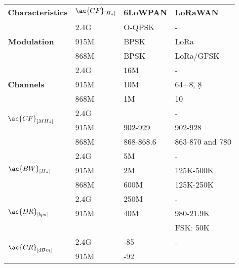\begin{table}
\centering
\begin{tabular}{l|l|l|l}
	\bf{Characteristics}               & $\ac{CF}_{[Hz]}$ & \bf{6LoWPAN} & \bf{LoRaWAN}     \\\hline
	\multirow{3}{*}{\bf{Modulation}}   & 2.4G             & O-QPSK       & -                \\
	\                                  & 915M             & BPSK         & LoRa             \\
	\                                  & 868M             & BPSK         & LoRa/GFSK        \\\hline
	\multirow{3}{*}{\bf{Channels}}     & 2.4G             & 16M          & -                \\
	\                                  & 915M             & 10M          & 64+8\u, 8\d      \\
	\                                  & 868M             & 1M           & 10               \\\hline
	\multirow{2}{*}{$\ac{CF}_{[MHz]}$} & 2.4G             & \ko          & -                \\
	\                                  & 915M             & 902-929      & 902-928          \\
	\                                  & 868M             & 868-868.6    & 863-870 and 780  \\\hline
	\multirow{3}{*}{$\ac{BW}_{[Hz]}$}  & 2.4G             & 5M           & -                \\
	\                                  & 915M             & 2M           & 125K-500K        \\
	\                                  & 868M             & 600M         & 125K-250K        \\\hline
	\multirow{3}{*}{$\ac{DR}_{[bps]}$} & 2.4G             & 250M         & -                \\
	\                                  & 915M             & 40M          & 980-21.9K        \\
	\                                  &                  &              & FSK:	50K         \\\hline
	\multirow{3}{*}{$\ac{CR}_{[dBm]}$} & 2.4G             & -85          & -                \\
	\                                  & 915M             & -92          & \ko              \\

\end{tabular}
\end{table}

